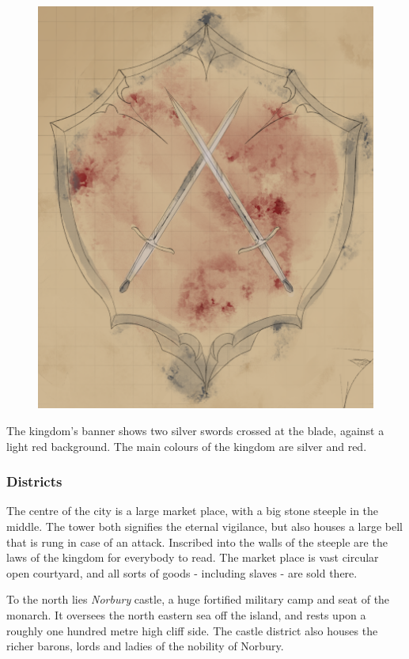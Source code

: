 \begin{figure}[!ht]
  \centering
  \includegraphics[width=0.9\linewidth]{media/norbury-bannersm.png}
\end{figure}

The kingdom's banner shows two silver swords crossed at the blade, against a
light red background. The main colours of the kingdom are silver and red.

\subsubsection{Districts}

The centre of the city is a large market place, with a big stone steeple in
the middle. The tower both signifies the eternal vigilance, but also houses a
large bell that is rung in case of an attack. Inscribed into the walls of
the steeple are the laws of the kingdom for everybody to read. The market
place is vast circular open courtyard, and all sorts of goods - including
slaves - are sold there.

To the north lies \emph{Norbury} castle, a huge fortified military camp and
seat of the monarch. It oversees the north eastern sea off the island, and
rests upon a roughly one hundred metre high cliff side. The castle district
also houses the richer barons, lords and ladies of the nobility of Norbury.

